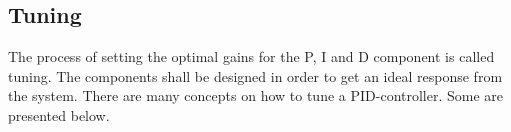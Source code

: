 \subsection{Tuning}
The process of setting the optimal gains for the P, I and D component is called tuning. The components shall be designed in order to get an ideal response from the system. There are many concepts on how to tune a PID-controller. Some are presented below.\\
\\
